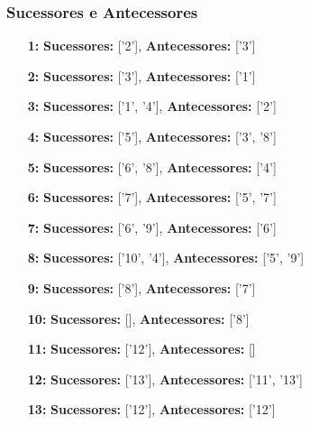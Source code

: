 \documentclass[a4paper,12pt]{article}
\begin{document}
\subsubsection*{Sucessores e Antecessores}
\begin{itemize}[leftmargin=*]
    \item[\textbf{1:}] \textbf{Sucessores:} ['2'], \textbf{Antecessores:} ['3']
    \item[\textbf{2:}] \textbf{Sucessores:} ['3'], \textbf{Antecessores:} ['1']
    \item[\textbf{3:}] \textbf{Sucessores:} ['1', '4'], \textbf{Antecessores:} ['2']
    \item[\textbf{4:}] \textbf{Sucessores:} ['5'], \textbf{Antecessores:} ['3', '8']
    \item[\textbf{5:}] \textbf{Sucessores:} ['6', '8'], \textbf{Antecessores:} ['4']
    \item[\textbf{6:}] \textbf{Sucessores:} ['7'], \textbf{Antecessores:} ['5', '7']
    \item[\textbf{7:}] \textbf{Sucessores:} ['6', '9'], \textbf{Antecessores:} ['6']
    \item[\textbf{8:}] \textbf{Sucessores:} ['10', '4'], \textbf{Antecessores:} ['5', '9']
    \item[\textbf{9:}] \textbf{Sucessores:} ['8'], \textbf{Antecessores:} ['7']
    \item[\textbf{10:}] \textbf{Sucessores:} [], \textbf{Antecessores:} ['8']
    \item[\textbf{11:}] \textbf{Sucessores:} ['12'], \textbf{Antecessores:} []
    \item[\textbf{12:}] \textbf{Sucessores:} ['13'], \textbf{Antecessores:} ['11', '13']
    \item[\textbf{13:}] \textbf{Sucessores:} ['12'], \textbf{Antecessores:} ['12']
\end{itemize}
\end{document}
